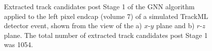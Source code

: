 \begin{figure}[htbp]%
    \centering
    \hfill
    \caption{Extracted track candidates post Stage 1 of the GNN algorithm applied to the left pixel endcap (volume 7) of a simulated TrackML detector event, shown from the view of the a) $x$-$y$ plane and b) $r$-$z$ plane. The total number of extracted track candidates post Stage 1 was 1054.}%
    \label{fig:trackml-results-endcap-extracted}%
\end{figure}

